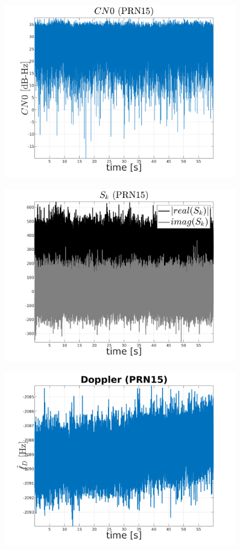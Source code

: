 \begin{figure}[H]
	\centering
	\includegraphics[width=0.9\textwidth]{fig/CN0_PRN15.png}
\end{figure}

\begin{figure}[H]
	\centering
	\includegraphics[width=0.9\textwidth]{fig/sk_PRN15.png}
\end{figure}

\begin{figure}[H]
	\centering
	\includegraphics[width=0.9\textwidth]{fig/doppler_PRN15.png}
\end{figure}


